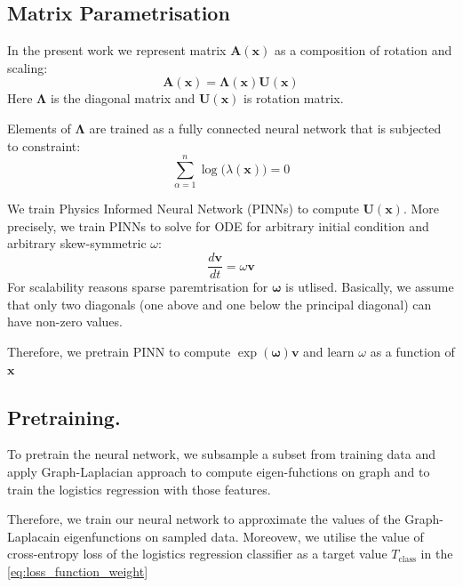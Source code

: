 \documentclass{article}
\theoremstyle{plain}
\theoremstyle{definition}
\theoremstyle{remark}
\begin{document}
\subsection{Matrix Parametrisation}
\label{subsec:matrix_parametrisation}
In the present work we represent matrix $\mathbf{A}(\mathbf{x})$ as a composition of rotation and scaling:
\begin{equation}
    \label{eq:amat_factorisation}
    \mathbf{A}(\mathbf{x}) = \mathbf{\Lambda} (\mathbf{x}) \mathbf{U}(\mathbf{x})
\end{equation}
Here $\mathbf{\Lambda}$ is the diagonal matrix and $\mathbf{U}(\mathbf{x})$ is rotation matrix.

Elements of $\mathbf{\Lambda}$ are trained as a fully connected neural network that is subjected to constraint:
\begin{equation}
    \label{eq:diagonal_constraint}
    \sum_{\alpha=1}^{n} \log\big(\lambda(\mathbf{x})\big) = 0
\end{equation}

We train Physics Informed Neural Network (PINNs) to compute $\mathbf{U}(\mathbf{x})$.
More precisely, we train PINNs to solve for ODE for arbitrary initial condition and arbitrary skew-symmetric $\omega$:
\begin{equation}
    \label{eq:pinn_ode}
    \frac{d\mathbf{v}}{dt} = \omega \mathbf{v}
\end{equation}
For scalability reasons sparse paremtrisation for $\mathbf{\omega}$ is utlised.
Basically, we assume that only two diagonals (one above and one below the principal diagonal) can have non-zero values.


Therefore, we pretrain PINN to compute $\exp(\mathbf{\omega}) \mathbf{v}$ and learn $\omega$ as a function of $\mathbf{x}$  


\subsection{Pretraining.}
\label{subsec:pretraining}
To pretrain the neural network, we subsample a subset from training data and apply Graph-Laplacian approach
to compute eigen-fuhctions on graph and to train the logistics regression with those features.

Therefore, we train our neural network to approximate the values of the Graph-Laplacain eigenfunctions on
sampled data. Moreovew, we utilise the value of cross-entropy loss of the logistics regression classifier
as a target value $T_{\text{class}}$ in the \eqref{eq:loss_function_weight}
\end{document}
